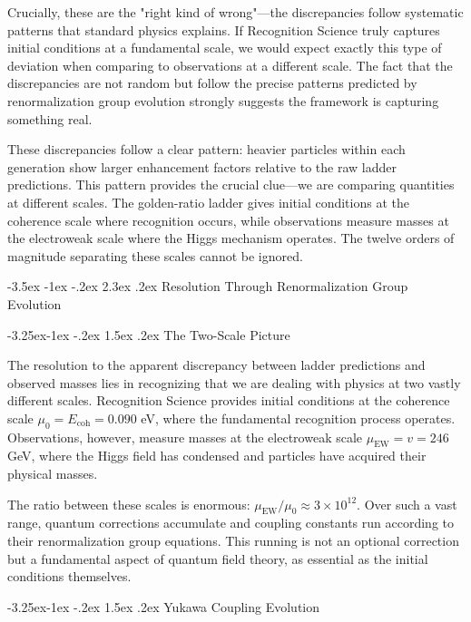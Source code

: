 \documentclass[11pt,a4paper]{article}
\makeatletter
\renewcommand\section{\@startsection{section}{1}{\z@}%
  {-3.5ex \@plus -1ex \@minus -.2ex}%
  {2.3ex \@plus.2ex}%
  {\normalfont\Large\bfseries\color{darkblue}}}
\renewcommand\subsection{\@startsection{subsection}{2}{\z@}%
  {-3.25ex\@plus -1ex \@minus -.2ex}%
  {1.5ex \@plus .2ex}%
  {\normalfont\large\bfseries\color{darkblue}}}
\theoremstyle{definition}
\newcommand{\Ecoh}{E_{\text{coh}}}
\newcommand{\muEW}{\mu_{\text{EW}}}
\makeatother
\begin{document}
Crucially, these are the "right kind of wrong"—the discrepancies follow systematic patterns that standard physics explains. If Recognition Science truly captures initial conditions at a fundamental scale, we would expect exactly this type of deviation when comparing to observations at a different scale. The fact that the discrepancies are not random but follow the precise patterns predicted by renormalization group evolution strongly suggests the framework is capturing something real.

These discrepancies follow a clear pattern: heavier particles within each generation show larger enhancement factors relative to the raw ladder predictions. This pattern provides the crucial clue—we are comparing quantities at different scales. The golden-ratio ladder gives initial conditions at the coherence scale where recognition occurs, while observations measure masses at the electroweak scale where the Higgs mechanism operates. The twelve orders of magnitude separating these scales cannot be ignored.

\section{Resolution Through Renormalization Group Evolution}

\subsection{The Two-Scale Picture}

The resolution to the apparent discrepancy between ladder predictions and observed masses lies in recognizing that we are dealing with physics at two vastly different scales. Recognition Science provides initial conditions at the coherence scale $\mu_0 = \Ecoh = 0.090$ eV, where the fundamental recognition process operates. Observations, however, measure masses at the electroweak scale $\muEW = v = 246$ GeV, where the Higgs field has condensed and particles have acquired their physical masses.

The ratio between these scales is enormous: $\muEW/\mu_0 \approx 3 \times 10^{12}$. Over such a vast range, quantum corrections accumulate and coupling constants run according to their renormalization group equations. This running is not an optional correction but a fundamental aspect of quantum field theory, as essential as the initial conditions themselves.

\subsection{Yukawa Coupling Evolution}
\end{document}
